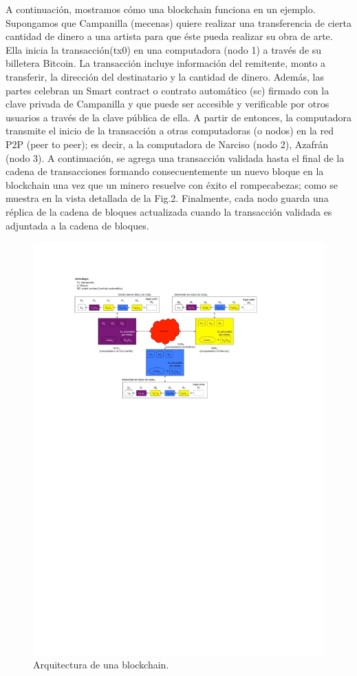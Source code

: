 \documentclass[12pt]{report} %
\begin{document}
A continuación, mostramos cómo una blockchain funciona en un ejemplo. Supongamos que Campanilla (mecenas) quiere realizar una transferencia de cierta cantidad de dinero a una artista para que éste pueda realizar su obra de arte. Ella inicia la transacción(tx0) en una computadora (nodo 1) a través de su billetera Bitcoin. La transacción incluye información del remitente, monto a transferir, la dirección del destinatario y la cantidad de dinero. Además, las partes celebran un Smart contract o contrato automático (sc) firmado con la clave privada de Campanilla y que puede ser accesible y verificable por otros usuarios a través de la clave pública de ella. A partir de entonces, la computadora transmite el inicio de la transacción a otras computadoras (o nodos) en la red P2P (peer to peer); es decir, a la computadora de Narciso (nodo 2), Azafrán (nodo 3). A continuación, se agrega una transacción validada hasta el final de la cadena de transacciones formando consecuentemente un nuevo bloque en la blockchain una vez que un minero resuelve con éxito el rompecabezas; como se muestra en la vista detallada de la Fig.2. Finalmente, cada nodo guarda una réplica de la cadena de bloques actualizada cuando la transacción validada es adjuntada a la cadena de bloques.



\begin{figure}
\centering
\includegraphics[width=0.85\columnwidth]{arqbc.pdf}
\caption{Arquitectura de una blockchain.}
\label{arqbc}
\end{figure} 
\end{document}
